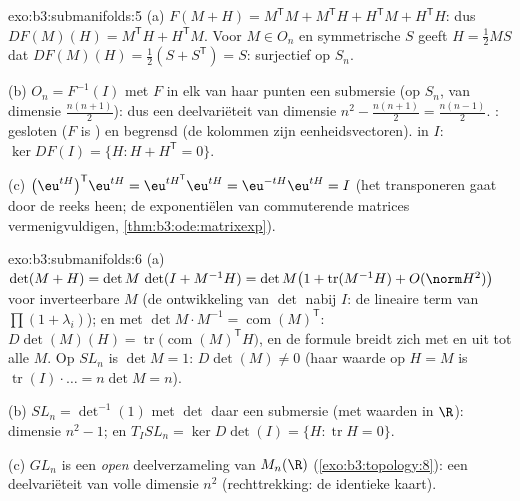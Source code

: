 \begin{solution}{exo:b3:submanifolds:5}
(a) $F(M + H) = M^{\mathsf T}M + M^{\mathsf T}H + H^{\mathsf
T}M + H^{\mathsf T}H$: dus $DF(M)(H) = M^{\mathsf T}H +
H^{\mathsf T}M$. Voor $M \in O_n$ en symmetrische $S$ geeft $H =
\frac12MS$ dat $DF(M)(H) = \frac12(S + S^{\mathsf T}) = S$:
surjectief op $S_n$.

(b) $O_n = F^{-1}(I)$ met $F$ in elk van haar punten een
submersie (op $S_n$, van dimensie $\frac{n(n+1)}2$): dus een
deelvariëteit van dimensie $n^2 - \frac{n(n+1)}2 =
\frac{n(n-1)}2$. : gesloten ($F$ is ) en begrensd
(de kolommen zijn eenheidsvectoren).  in $I$: $\ker
DF(I) = \{H : H + H^{\mathsf T} = 0\}$.

(c) $\bigl(\eu^{tH}\bigr)^{\mathsf T}\eu^{tH} =
\eu^{tH^{\mathsf T}}\eu^{tH} = \eu^{-tH}\eu^{tH} = I$ (het
transponeren gaat door de reeks heen; de exponentiëlen van
commuterende matrices vermenigvuldigen,
\cref{thm:b3:ode:matrixexp}).
\end{solution}

\begin{solution}{exo:b3:submanifolds:6}
(a) $\det(M + H) = \det M\,\det(I + M^{-1}H) = \det M\bigl(1 +
\operatorname{tr}(M^{-1}H) + O(\norm H^2)\bigr)$ voor
inverteerbare $M$ (de ontwikkeling van $\det$ nabij $I$: de
lineaire term van $\prod(1 + \lambda_i)$); en met $\det M\cdot
M^{-1} = \operatorname{com}(M)^{\mathsf T}$: $D\det(M)(H) =
\operatorname{tr}\bigl(\operatorname{com}(M)^{\mathsf T}H\bigr)$,
en de formule breidt zich met  en  uit tot
alle $M$. Op $SL_n$ is $\det M = 1$: $D\det(M) \ne 0$ (haar
waarde op $H = M$ is $\operatorname{tr}(I)\cdot\dots = n\det M =
n$).

(b) $SL_n = \det^{-1}(1)$ met $\det$ daar een submersie (met
waarden in $\R$): dimensie $n^2 - 1$; en $T_ISL_n = \ker
D\det(I) = \{H : \operatorname{tr}H = 0\}$.

(c) $GL_n$ is een \emph{open} deelverzameling van $M_n(\R)$
(\cref{exo:b3:topology:8}): een deelvariëteit van volle dimensie
$n^2$ (rechttrekking: de identieke kaart).
\end{solution}

